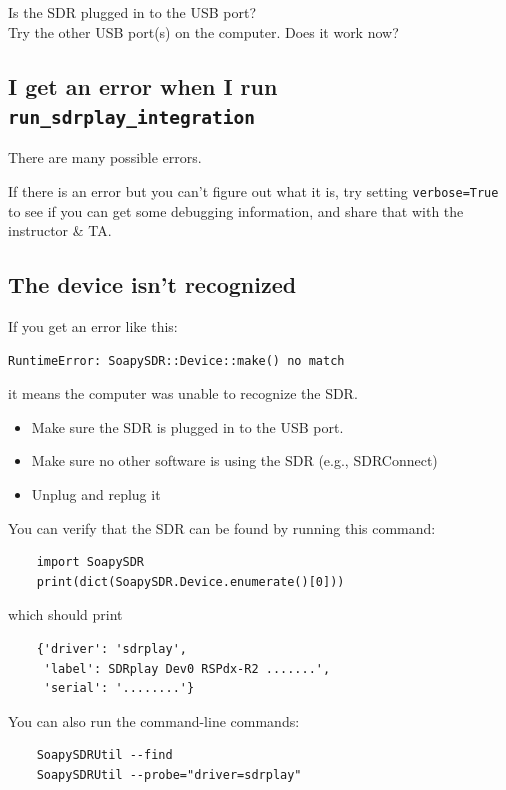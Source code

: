 \documentclass[11pt]{article}
\begin{document}
Is the SDR plugged in to the USB port?\\
Try the other USB port(s) on the computer.  Does it work now?\\


\subsection{I get an error when I run \texttt{run\_sdrplay\_integration}}
There are many possible errors.

If there is an error but you can't figure out what it is,
try setting \verb|verbose=True| to see if you can get some
debugging information, and share that with the instructor \& TA.




\subsection{The device isn't recognized}

If you get an error like this:
\begin{verbatim}
RuntimeError: SoapySDR::Device::make() no match
\end{verbatim}
it means the computer was unable to recognize the SDR.

\begin{itemize}
    \item Make sure the SDR is plugged in to the USB port.
    \item Make sure no other software is using the SDR (e.g., SDRConnect)
    \item Unplug and replug it
\end{itemize}

You can verify that the SDR can be found by running this command:

\begin{verbatim}
    import SoapySDR
    print(dict(SoapySDR.Device.enumerate()[0]))
\end{verbatim}

which should print
\begin{verbatim}
    {'driver': 'sdrplay',
     'label': SDRplay Dev0 RSPdx-R2 .......',
     'serial': '........'}
\end{verbatim}

You can also run the command-line commands:
\begin{verbatim}
    SoapySDRUtil --find
    SoapySDRUtil --probe="driver=sdrplay"
\end{verbatim}
\end{document}
